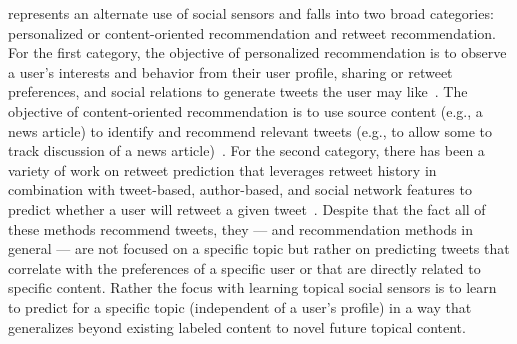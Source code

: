 %

%

% 

\vspace{2mm}
 represents an alternate use of
social sensors and falls into two broad categories:
personalized or content-oriented recommendation and retweet
recommendation.  For the first category, the objective of personalized
recommendation is to observe a user's interests and behavior from
their user profile, sharing or retweet preferences, and social
relations to generate tweets the user may like~\cite{Yan,chen}.  The
objective of content-oriented recommendation is to use source content
(e.g., a news article) to identify and recommend relevant tweets
(e.g., to allow some to track discussion of a news
article)~\cite{Krestel}.  For the second category, there has been a
variety of work on retweet prediction that leverages retweet history
in combination with tweet-based, author-based, and social network
features to predict whether a user will retweet a given
tweet~\cite{can,xu,petrovicOsborne}.  Despite that the fact all of
these methods recommend tweets, they --- and recommendation methods in
general --- are not focused on a specific topic but rather on
predicting tweets that correlate with the preferences of a specific
user or that are directly related to specific content.  Rather the
focus with learning topical social sensors is to learn to predict for
a specific topic (independent of a user's profile) in a way that
generalizes beyond existing labeled content to novel future topical
content.

